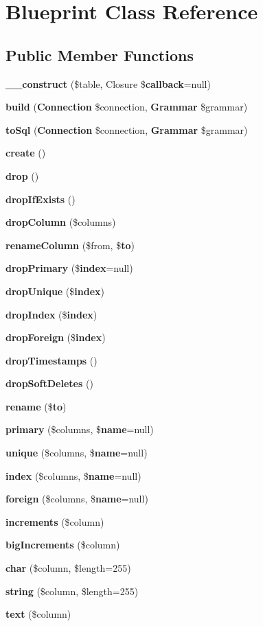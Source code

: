 \section{Blueprint Class Reference}
\label{class_illuminate_1_1_database_1_1_schema_1_1_blueprint}
\subsection*{Public Member Functions}
\begin{DoxyCompactItemize}
\item 
{\bf \+\_\+\+\_\+construct} (\$table, Closure \${\bf callback}=null)
\item 
{\bf build} ({\bf Connection} \$connection, {\bf Grammar} \$grammar)
\item 
{\bf to\+Sql} ({\bf Connection} \$connection, {\bf Grammar} \$grammar)
\item 
{\bf create} ()
\item 
{\bf drop} ()
\item 
{\bf drop\+If\+Exists} ()
\item 
{\bf drop\+Column} (\$columns)
\item 
{\bf rename\+Column} (\$from, \${\bf to})
\item 
{\bf drop\+Primary} (\${\bf index}=null)
\item 
{\bf drop\+Unique} (\${\bf index})
\item 
{\bf drop\+Index} (\${\bf index})
\item 
{\bf drop\+Foreign} (\${\bf index})
\item 
{\bf drop\+Timestamps} ()
\item 
{\bf drop\+Soft\+Deletes} ()
\item 
{\bf rename} (\${\bf to})
\item 
{\bf primary} (\$columns, \${\bf name}=null)
\item 
{\bf unique} (\$columns, \${\bf name}=null)
\item 
{\bf index} (\$columns, \${\bf name}=null)
\item 
{\bf foreign} (\$columns, \${\bf name}=null)
\item 
{\bf increments} (\$column)
\item 
{\bf big\+Increments} (\$column)
\item 
{\bf char} (\$column, \$length=255)
\item 
{\bf string} (\$column, \$length=255)
\item 
{\bf text} (\$column)
\item 

\end{DoxyCompactItemize}
